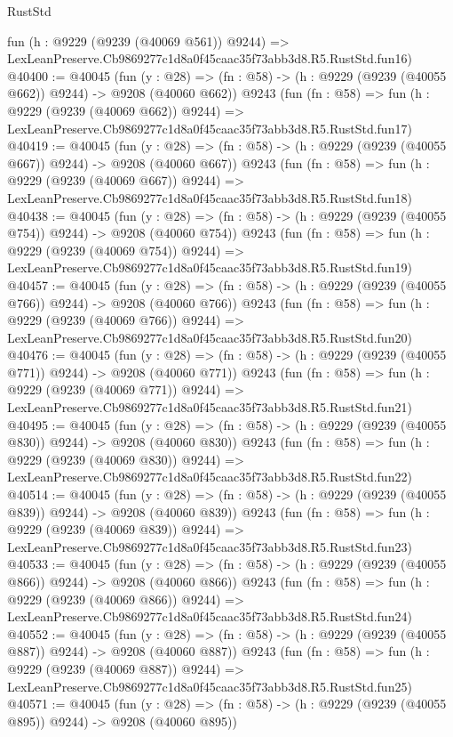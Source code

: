 \begin{lexlean}{RustStd}
\begin{coremodule}
    fun (h : @9229 (@9239 (@40069 @561)) @9244) =>
    LexLeanPreserve.Cb9869277c1d8a0f45caac35f73abb3d8.R5.RustStd.fun16)
@40400 := @40045
    (fun (y : @28) => (fn : @58) -> (h : @9229 (@9239 (@40055 @662)) @9244) -> @9208 (@40060 @662))
    @9243
    (fun (fn : @58) =>
    fun (h : @9229 (@9239 (@40069 @662)) @9244) =>
    LexLeanPreserve.Cb9869277c1d8a0f45caac35f73abb3d8.R5.RustStd.fun17)
@40419 := @40045
    (fun (y : @28) => (fn : @58) -> (h : @9229 (@9239 (@40055 @667)) @9244) -> @9208 (@40060 @667))
    @9243
    (fun (fn : @58) =>
    fun (h : @9229 (@9239 (@40069 @667)) @9244) =>
    LexLeanPreserve.Cb9869277c1d8a0f45caac35f73abb3d8.R5.RustStd.fun18)
@40438 := @40045
    (fun (y : @28) => (fn : @58) -> (h : @9229 (@9239 (@40055 @754)) @9244) -> @9208 (@40060 @754))
    @9243
    (fun (fn : @58) =>
    fun (h : @9229 (@9239 (@40069 @754)) @9244) =>
    LexLeanPreserve.Cb9869277c1d8a0f45caac35f73abb3d8.R5.RustStd.fun19)
@40457 := @40045
    (fun (y : @28) => (fn : @58) -> (h : @9229 (@9239 (@40055 @766)) @9244) -> @9208 (@40060 @766))
    @9243
    (fun (fn : @58) =>
    fun (h : @9229 (@9239 (@40069 @766)) @9244) =>
    LexLeanPreserve.Cb9869277c1d8a0f45caac35f73abb3d8.R5.RustStd.fun20)
@40476 := @40045
    (fun (y : @28) => (fn : @58) -> (h : @9229 (@9239 (@40055 @771)) @9244) -> @9208 (@40060 @771))
    @9243
    (fun (fn : @58) =>
    fun (h : @9229 (@9239 (@40069 @771)) @9244) =>
    LexLeanPreserve.Cb9869277c1d8a0f45caac35f73abb3d8.R5.RustStd.fun21)
@40495 := @40045
    (fun (y : @28) => (fn : @58) -> (h : @9229 (@9239 (@40055 @830)) @9244) -> @9208 (@40060 @830))
    @9243
    (fun (fn : @58) =>
    fun (h : @9229 (@9239 (@40069 @830)) @9244) =>
    LexLeanPreserve.Cb9869277c1d8a0f45caac35f73abb3d8.R5.RustStd.fun22)
@40514 := @40045
    (fun (y : @28) => (fn : @58) -> (h : @9229 (@9239 (@40055 @839)) @9244) -> @9208 (@40060 @839))
    @9243
    (fun (fn : @58) =>
    fun (h : @9229 (@9239 (@40069 @839)) @9244) =>
    LexLeanPreserve.Cb9869277c1d8a0f45caac35f73abb3d8.R5.RustStd.fun23)
@40533 := @40045
    (fun (y : @28) => (fn : @58) -> (h : @9229 (@9239 (@40055 @866)) @9244) -> @9208 (@40060 @866))
    @9243
    (fun (fn : @58) =>
    fun (h : @9229 (@9239 (@40069 @866)) @9244) =>
    LexLeanPreserve.Cb9869277c1d8a0f45caac35f73abb3d8.R5.RustStd.fun24)
@40552 := @40045
    (fun (y : @28) => (fn : @58) -> (h : @9229 (@9239 (@40055 @887)) @9244) -> @9208 (@40060 @887))
    @9243
    (fun (fn : @58) =>
    fun (h : @9229 (@9239 (@40069 @887)) @9244) =>
    LexLeanPreserve.Cb9869277c1d8a0f45caac35f73abb3d8.R5.RustStd.fun25)
@40571 := @40045
    (fun (y : @28) => (fn : @58) -> (h : @9229 (@9239 (@40055 @895)) @9244) -> @9208 (@40060 @895))

\end{coremodule}
\end{lexlean}
